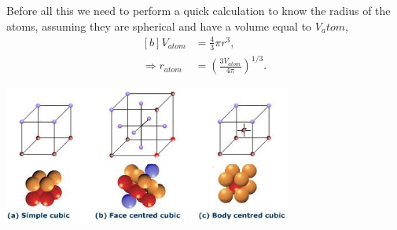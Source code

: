 
\begin{questions}
\begin{solution}
Before all this we need to perform a quick calculation to know the radius of the atoms, assuming they are spherical and have a volume equal to $V_atom$,
\begin{equation}
  \begin{aligned}[b]
    V_{atom} &= \frac{4}{3}\pi r^3,\\
    \Rightarrow r_{atom} &= \left(\frac{3V_{atom}}{4\pi}\right)^{1/3}.
  \end{aligned}
  \label{radius}
\end{equation}


\begin{center}
  \includegraphics[width=95mm]{cells}
\end{center}

\label{u:cells}\vspace{0.5cm}


\end{solution}
\end{questions}
